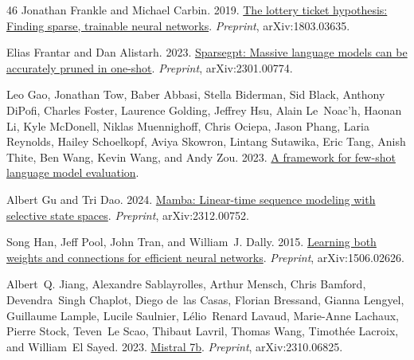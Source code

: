 \documentclass[11pt]{article}
\begin{document}
\begin{thebibliography}{46}
Jonathan Frankle and Michael Carbin. 2019.
\newblock \href {https://arxiv.org/abs/1803.03635} {The lottery ticket hypothesis: Finding sparse, trainable neural networks}.
\newblock \emph{Preprint}, arXiv:1803.03635.

Elias Frantar and Dan Alistarh. 2023.
\newblock \href {https://arxiv.org/abs/2301.00774} {Sparsegpt: Massive language models can be accurately pruned in one-shot}.
\newblock \emph{Preprint}, arXiv:2301.00774.

Leo Gao, Jonathan Tow, Baber Abbasi, Stella Biderman, Sid Black, Anthony DiPofi, Charles Foster, Laurence Golding, Jeffrey Hsu, Alain Le~Noac'h, Haonan Li, Kyle McDonell, Niklas Muennighoff, Chris Ociepa, Jason Phang, Laria Reynolds, Hailey Schoelkopf, Aviya Skowron, Lintang Sutawika, Eric Tang, Anish Thite, Ben Wang, Kevin Wang, and Andy Zou. 2023.
\newblock \href {https://doi.org/10.5281/zenodo.10256836} {A framework for few-shot language model evaluation}.

Albert Gu and Tri Dao. 2024.
\newblock \href {https://arxiv.org/abs/2312.00752} {Mamba: Linear-time sequence modeling with selective state spaces}.
\newblock \emph{Preprint}, arXiv:2312.00752.

Song Han, Jeff Pool, John Tran, and William~J. Dally. 2015.
\newblock \href {https://arxiv.org/abs/1506.02626} {Learning both weights and connections for efficient neural networks}.
\newblock \emph{Preprint}, arXiv:1506.02626.

Albert~Q. Jiang, Alexandre Sablayrolles, Arthur Mensch, Chris Bamford, Devendra~Singh Chaplot, Diego de~las Casas, Florian Bressand, Gianna Lengyel, Guillaume Lample, Lucile Saulnier, Lélio~Renard Lavaud, Marie-Anne Lachaux, Pierre Stock, Teven~Le Scao, Thibaut Lavril, Thomas Wang, Timothée Lacroix, and William~El Sayed. 2023.
\newblock \href {https://arxiv.org/abs/2310.06825} {Mistral 7b}.
\newblock \emph{Preprint}, arXiv:2310.06825.


\end{thebibliography}
\end{document}
